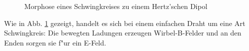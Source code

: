 \begin{figure}
   \caption{Morphose eines Schwingkreises zu einem Hertz'schen Dipol}
   \label{abb_morphose_dipol}
\end{figure}
Wie in Abb. \ref{abb_morphose_dipol} gezeigt, handelt es sich bei
einem einfachen Draht um eine Art Schwingkreis: Die bewegten Ladungen
erzeugen Wirbel-B-Felder und an den Enden sorgen sie f"ur ein E-Feld.

